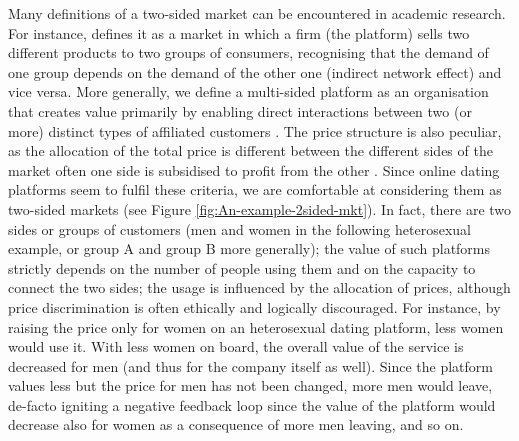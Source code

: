Many definitions of a two-sided market can be encountered in academic
research. For instance, \citealp{Evans2003Some-Empirical-} defines
it as a market in which a firm (the platform) sells two different
products to two groups of consumers, recognising that the demand of
one group depends on the demand of the other one (indirect network
effect) \textendash{} and vice versa. More generally, we define a
multi-sided platform as an organisation that creates value primarily
by enabling direct interactions between two (or more) distinct types
of affiliated customers \citep{Hagiu2015Multi-Sided-Pla}. The price
structure is also peculiar, as the allocation of the total price is
different between the different sides of the market \textendash{}
often one side is subsidised to profit from the other \citep{Rochet2003Platform-Compet}.
Since online dating platforms seem to fulfil these criteria, we are
comfortable at considering them as two-sided markets (see Figure \ref{fig:An-example-2sided-mkt}).
In fact, there are two sides or groups of customers (men and women
in the following heterosexual example, or group A and group B more
generally); the value of such platforms strictly depends on the number
of people using them and on the capacity to connect the two sides;
the usage is influenced by the allocation of prices, although price
discrimination is often ethically and logically discouraged. For instance,
by raising the price only for women on an heterosexual dating platform,
less women would use it. With less women on board, the overall value
of the service is decreased for men (and thus for the company itself
as well). Since the platform values less but the price for men has
not been changed, more men would leave, de-facto igniting a negative
feedback loop since the value of the platform would decrease also
for women as a consequence of more men leaving, and so on.


